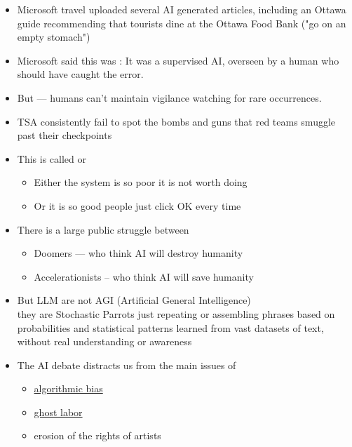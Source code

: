 \documentclass[25pt,a4paper,landscape,headrule,footrule,xetex]{foils}
\begin{document}

\begin{itemize}\addtolength{\itemsep}{-1ex}
\item Microsoft travel uploaded several AI generated articles,
  including an Ottawa guide recommending that tourists dine
  at the Ottawa Food Bank ("go on an empty stomach")
\item Microsoft said this was : It was a supervised AI, overseen by a human who should have caught the error.
\item But --- humans can't maintain vigilance watching for rare occurrences.
\item TSA consistently fail to spot the bombs and guns that red teams
   smuggle past their checkpoints
 \item This is called  or 
   \begin{itemize}
   \item Either the system is so poor it is not worth doing
   \item Or it is so good people just click OK every time
   \end{itemize}
 \end{itemize}


\begin{itemize}
\item There is a large public struggle between
  \begin{itemize}
  \item Doomers --- who think AI will destroy humanity
  \item Accelerationists -- who think AI will save humanity
  \end{itemize}
\item But LLM are not AGI (Artificial General Intelligence)
  \\ they are Stochastic Parrots just repeating or assembling phrases based on probabilities and statistical patterns learned from vast datasets of text, without real understanding or awareness \citep{10.1145/3442188.3445922}
\item The AI debate distracts us from the main issues of
  \begin{itemize}
  \item \href{https://en.wikipedia.org/wiki/Algorithmic_bias}{algorithmic bias}
  \item \href{https://en.wikipedia.org/wiki/Ghost_work}{ghost labor}
  \item erosion of the rights of artists
  \end{itemize}
\end{itemize}
\end{document}
